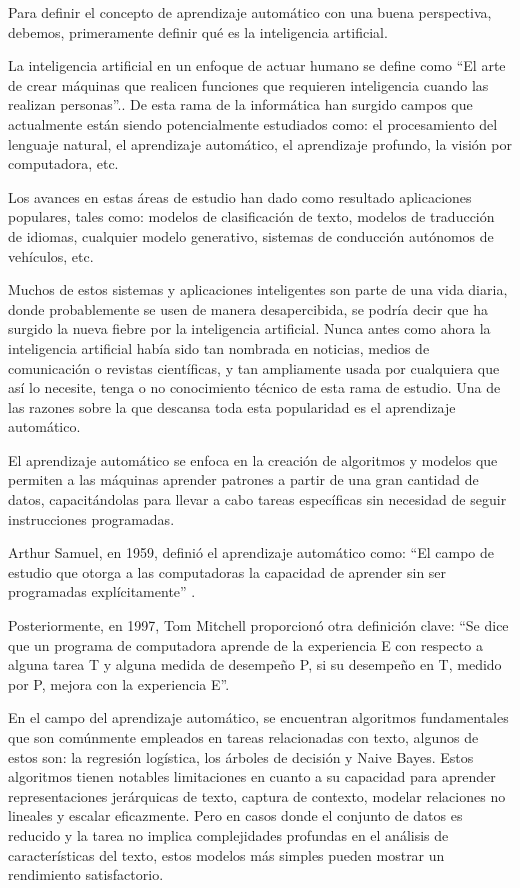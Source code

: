 Para definir el concepto de aprendizaje automático con una buena perspectiva, debemos, primeramente definir qué es la inteligencia artificial. 

La inteligencia artificial en un enfoque de actuar humano se define como ``El arte de crear máquinas que realicen funciones que requieren inteligencia cuando las realizan personas''.\cite[p. 2]{stuart2010artificial}. De esta rama de la informática han surgido campos que actualmente están siendo potencialmente estudiados como: el procesamiento del lenguaje natural, el aprendizaje automático, el aprendizaje profundo, la visión por computadora, etc.

Los avances en estas áreas de estudio han dado como resultado aplicaciones populares, tales como: modelos de clasificación de texto, modelos de traducción de idiomas, cualquier modelo generativo, sistemas de conducción autónomos de vehículos, etc.

Muchos de estos sistemas y aplicaciones inteligentes son parte de una vida diaria, donde probablemente se usen de manera desapercibida, se podría decir que ha surgido la nueva fiebre por la inteligencia artificial. Nunca antes como ahora la inteligencia artificial había sido tan nombrada en noticias, medios de comunicación o revistas científicas, y tan ampliamente usada por cualquiera que así lo necesite, tenga o no conocimiento técnico de esta rama de estudio. Una de las razones sobre la que descansa toda esta popularidad es el aprendizaje automático.

El aprendizaje automático se enfoca en la creación de algoritmos y modelos que permiten a las máquinas aprender patrones a partir de una gran cantidad de datos, capacitándolas para llevar a cabo tareas específicas sin necesidad de seguir instrucciones programadas.

Arthur Samuel, en 1959, definió el aprendizaje automático como: ``El campo de estudio que otorga a las computadoras la capacidad de aprender sin ser programadas explícitamente'' \cite[p. 281]{geron2019hands}.

Posteriormente, en 1997, Tom Mitchell proporcionó otra definición clave: ``Se dice que un programa de computadora aprende de la experiencia E con respecto a alguna tarea T y alguna medida de desempeño P, si su desempeño en T, medido por P, mejora con la experiencia E''\cite[p. 281]{geron2019hands}.

En el campo del aprendizaje automático, se encuentran algoritmos fundamentales que son comúnmente empleados en tareas relacionadas con texto, algunos de estos son: la regresión logística, los árboles de decisión y Naive Bayes. Estos algoritmos tienen notables limitaciones en cuanto a su capacidad para aprender representaciones jerárquicas de texto, captura de contexto, modelar relaciones no lineales y escalar eficazmente. Pero en casos donde el conjunto de datos es reducido y la tarea no implica complejidades profundas en el análisis de características del texto, estos modelos más simples pueden mostrar un rendimiento satisfactorio.

